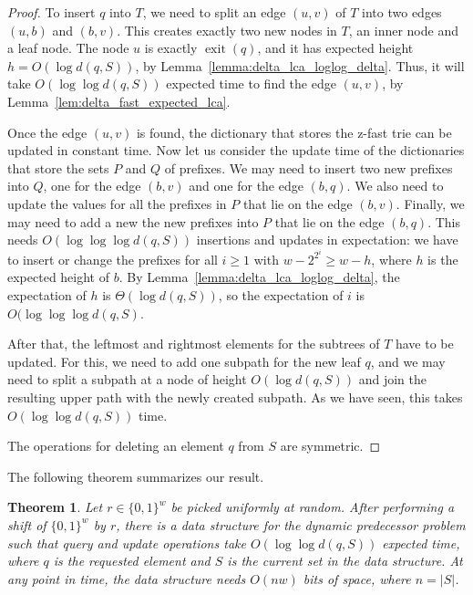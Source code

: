 \documentclass[a4paper,11pt]{article}
\newtheorem{theorem}{Theorem}[section]
\newcommand{\?}{\mskip1.5mu}
\DeclareMathOperator{\exit}{exit}
\begin{document}
\begin{proof}
To insert $q$ into $T$, we need to split an edge $(u,v)$ of $T$ into
two edges $(u,b)$ and $(b,v)$. This creates
exactly two new nodes in $T$, an inner node and a leaf node. 
The node $u$ is exactly $\exit(q)$, and it has expected height 
$h = O(\log d(q, S))$, by Lemma~\ref{lemma:delta_lca_loglog_delta}. 
Thus, it will
take $O(\log\log d(q, S))$ expected time to find
the edge $(u,v)$, by
Lemma~\ref{lem:delta_fast_expected_lca}.

Once the edge $(u,v)$ is found, the dictionary that stores
the z-fast trie
can be updated in constant time.
Now let us consider the update time of the 
dictionaries that store the sets $P$ and $Q$ of prefixes.
We may need to insert two new prefixes into $Q$, one
for the edge $(b, v)$ and one for the edge $(b,q)$. 
We also need  to
update the values for all the prefixes in $P$ that lie
on the edge $(b,v)$.
Finally, we may need to add a new the new prefixes
into $P$ that lie on the edge $(b,q)$.
This needs
$O(\log\log\log d(q,S))$ insertions and updates in expectation: we
have to insert or change the prefixes for all 
$i \geq 1$ with $w - 2^{2^i} \geq w - h$, where
$h$ is the expected height of $b$. By Lemma~\ref{lemma:delta_lca_loglog_delta},
the expectation of $h$ is $\Theta(\log d(q, S))$,
so the expectation of $i$ is $O(\log\log\log d(q, S)$.

After that, the leftmost and rightmost elements for the subtrees
of $T$ have to be updated. For this, we need to add one
subpath for the new leaf $q$, and we may need to split
a subpath at a node of height $O(\log d(q, S))$ and join
the resulting upper path with the newly created subpath. As we
have seen, this takes $O(\log \log d(q, S))$ time.

The operations for deleting an element $q$ from $S$ are symmetric.
\end{proof}

The following theorem summarizes our result.

\begin{theorem}
Let $r \in \{0, 1\}^w$ be picked uniformly at random.
After performing a shift of $\{0, 1\}^w$ by $r$, 
there is a data structure for the
dynamic predecessor problem such that 
query and update operations take $O(\log \log d(q, S))$ 
expected
time, where $q$ is the
requested element and 
$S$ is the current set in the data structure. At any point in time, 
the data structure needs $O(nw)$ bits of space, where $n = |S|$.
\end{theorem}
\end{document}
